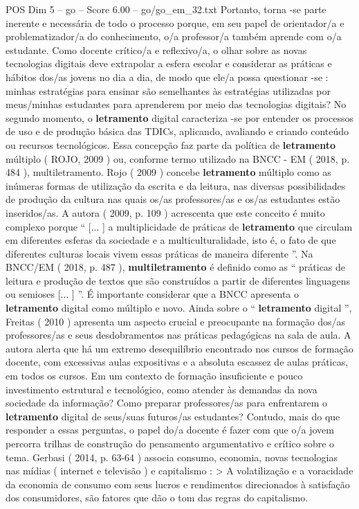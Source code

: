 \begin{textsample}{POS Dim 5 – go – Score 6.00 – go/go\_em\_32.txt}
Portanto, torna -se parte inerente e necessária de todo o processo porque, em seu papel de orientador/a e problematizador/a do conhecimento, o/a professor/a também aprende com o/a estudante.
Como docente crítico/a e reflexivo/a, o olhar sobre as novas tecnologias digitais deve extrapolar a esfera escolar e considerar as práticas e hábitos dos/as jovens no dia a dia, de modo que ele/a possa questionar -se : minhas estratégias para ensinar são semelhantes às estratégias utilizadas por meus/minhas estudantes para aprenderem por meio das tecnologias digitais?
No segundo momento, o \textbf{letramento} digital caracteriza -se por entender os processos de uso e de produção básica das TDICs, aplicando, avaliando e criando conteúdo ou recursos tecnológicos.
Essa concepção faz parte da política de \textbf{letramento} múltiplo ( ROJO, 2009 ) ou, conforme termo utilizado na BNCC - EM ( 2018, p. 484 ), multiletramento.
Rojo ( 2009 ) concebe \textbf{letramento} múltiplo como as inúmeras formas de utilização da escrita e da leitura, nas diversas possibilidades de produção da cultura nas quais os/as professores/as e os/as estudantes estão inseridos/as.
A autora ( 2009, p. 109 ) acrescenta que este conceito é muito complexo porque “ [... ] a multiplicidade de práticas de \textbf{letramento} que circulam em diferentes esferas da sociedade e a multiculturalidade, isto é, o fato de que diferentes culturas locais vivem essas práticas de maneira diferente ”.
Na BNCC/EM ( 2018, p. 487 ), \textbf{multiletramento} é definido como as “ práticas de leitura e produção de textos que são construídos a partir de diferentes linguagens ou semioses [... ] ”.
É importante considerar que a BNCC apresenta o \textbf{letramento} digital como múltiplo e novo.
Ainda sobre o “ \textbf{letramento} digital ”, Freitas ( 2010 ) apresenta um aspecto crucial e preocupante na formação dos/as professores/as e seus desdobramentos nas práticas pedagógicas na sala de aula.
A autora alerta que há um extremo desequilíbrio encontrado nos cursos de formação docente, com excessivas aulas expositivas e a absoluta escassez de aulas práticas, em todos os cursos.
Em um contexto de formação insuficiente e pouco investimento estrutural e tecnológico, como atender às demandas da nova sociedade da informação?
Como preparar professores/as para enfrentarem o \textbf{letramento} digital de seus/suas futuros/as estudantes?
Contudo, mais do que responder a essas perguntas, o papel do/a docente é fazer com que o/a jovem percorra trilhas de construção do pensamento argumentativo e crítico sobre o tema.
Gerbasi ( 2014, p. 63-64 ) associa consumo, economia, novas tecnologias nas mídias ( internet e televisão ) e capitalismo : > A volatilização e a voracidade da economia de consumo com seus lucros e rendimentos direcionados à satisfação dos consumidores, são fatores que dão o tom das regras do capitalismo.

\end{textsample}
